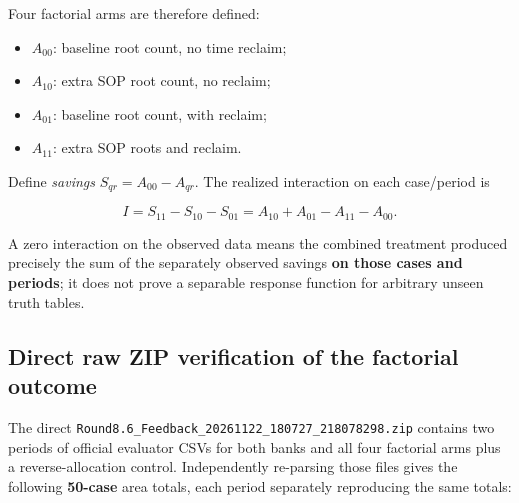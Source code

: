 Four factorial arms are therefore defined:

\begin{itemize}
\tightlist
\item
  \(A_{00}\): baseline root count, no time reclaim;
\item
  \(A_{10}\): extra SOP root count, no reclaim;
\item
  \(A_{01}\): baseline root count, with reclaim;
\item
  \(A_{11}\): extra SOP roots and reclaim.
\end{itemize}

Define \emph{savings} \(S_{qr}=A_{00}-A_{qr}\). The realized interaction on each case/period is

\[
I=S_{11}-S_{10}-S_{01}
=A_{10}+A_{01}-A_{11}-A_{00}.
\]

A zero interaction on the observed data means the combined treatment produced precisely the sum of the separately observed savings \textbf{on those cases and periods}; it does not prove a separable response function for arbitrary unseen truth tables.

\subsection{Direct raw ZIP verification of the factorial outcome}\label{direct-raw-zip-verification-of-the-factorial-outcome}

The direct \texttt{Round8.6\_Feedback\_20261122\_180727\_218078298.zip} contains two periods of official evaluator CSVs for both banks and all four factorial arms plus a reverse-allocation control. Independently re-parsing those files gives the following \textbf{50-case} area totals, each period separately reproducing the same totals:

